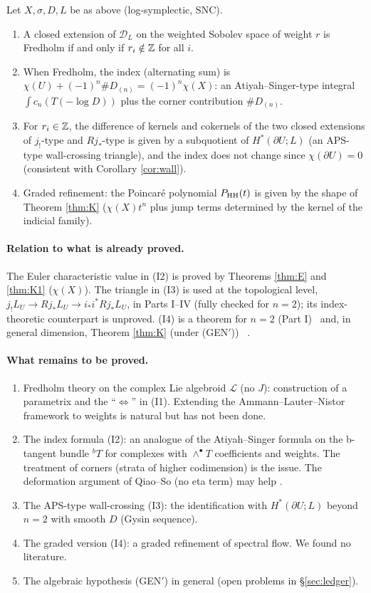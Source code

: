 \begin{conj}\label{conj:index}
Let $X,\sigma,D,L$ be as above (log-symplectic, SNC).
\begin{enumerate}
\item[(I1)] A closed extension of $\mathcal D_L$ on the weighted Sobolev space of weight $r$ is Fredholm if and only if $r_i\notin\mathbb Z$ for all $i$.
\item[(I2)] When Fredholm, the index (alternating sum) is $\chi(U)+(-1)^n\#D_{(n)}=(-1)^n\chi(X)$: an Atiyah--Singer-type integral $\int c_n(T(-\log D))$ plus the corner contribution $\#D_{(n)}$.
\item[(I3)] For $r_i\in\mathbb Z$, the difference of kernels and cokernels of the two closed extensions of $j_!$-type and $Rj_*$-type is given by a subquotient of $H^*(\partial U;L)$ (an APS-type wall-crossing triangle), and the index does not change since $\chi(\partial U)=0$ (consistent with Corollary \ref{cor:wall}).
\item[(I4)] Graded refinement: the Poincar\'e polynomial $P_{\mathrm{HH}}(t)$ is given by the shape of Theorem \ref{thm:K} ($\chi(X)t^n$ plus jump terms determined by the kernel of the indicial family).
\end{enumerate}
\end{conj}
\paragraph{Relation to what is already proved.} The Euler characteristic value in (I2) is proved by Theorems \ref{thm:E} and \ref{thm:K1} ($\chi(X)$). The triangle in (I3) is used at the topological level, $j_!L_U\to Rj_*L_U\to i_*i^*Rj_*L_U$, in Parts I--IV (fully checked for $n=2$); its index-theoretic counterpart is unproved. (I4) is a theorem for $n=2$ (Part I) \tP\ and, in general dimension, Theorem \ref{thm:K} (under (GEN$'$)) \tP\ \tQ.

\paragraph{What remains to be proved.}
\begin{enumerate}
\item Fredholm theory on the complex Lie algebroid $\mathcal L$ (no $J$): construction of a parametrix and the ``$\Leftrightarrow$'' in (I1). Extending the Ammann--Lauter--Nistor framework to weights is natural but has not been done.
\item The index formula (I2): an analogue of the Atiyah--Singer formula on the b-tangent bundle $^bT$ \cite{BLS} for complexes with $\wedge^\bullet T$ coefficients and weights. The treatment of corners (strata of higher codimension) is the issue. The deformation argument of Qiao--So (no eta term) may help \tQ.
\item The APS-type wall-crossing (I3): the identification with $H^*(\partial U;L)$ beyond $n=2$ with smooth $D$ (Gysin sequence).
\item The graded version (I4): a graded refinement of spectral flow. We found no literature.
\item The algebraic hypothesis (GEN$'$) in general (open problems in \S\ref{sec:ledger}).
\end{enumerate}


